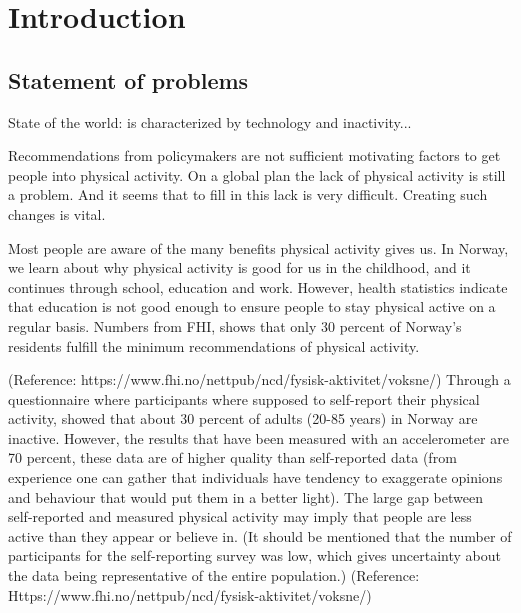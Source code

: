 \chapter{Introduction} 


\section{Statement of problems}
State of the world: is characterized by technology and inactivity... 

Recommendations from policymakers are not sufficient motivating factors to get people into physical activity. On a global plan the lack of physical activity is still a problem. And it seems that to fill in this lack is very difficult. Creating such changes is vital. 

Most people are aware of the many benefits physical activity gives us. In Norway, we learn about why physical activity is good for us in the childhood, and it continues through school, education and work. However, health statistics indicate that education is not good enough to ensure people to stay physical active on a regular basis. Numbers from FHI, shows that only 30 percent of Norway's residents fulfill the minimum recommendations of physical activity. 

(Reference: https://www.fhi.no/nettpub/ncd/fysisk-aktivitet/voksne/) Through a questionnaire where participants where supposed to self-report their physical activity, showed that about 30 percent of adults (20-85 years) in Norway are inactive. However, the results that have been measured with an accelerometer are 70 percent, these data are of higher quality than self-reported data (from experience one can gather that individuals have tendency to exaggerate opinions and behaviour that would put them in a better light). The large gap between self-reported and measured physical activity may imply that people are less active than they appear or believe in. (It should be mentioned that the number of participants for the self-reporting survey was low, which gives uncertainty about the data being representative of the entire population.) (Reference: Https://www.fhi.no/nettpub/ncd/fysisk-aktivitet/voksne/)

